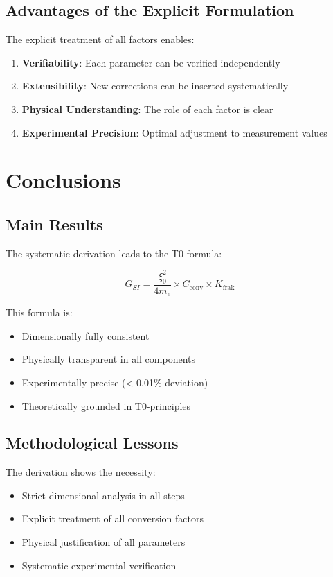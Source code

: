 \documentclass[12pt,a4paper]{article}
\newcommand{\Kfrak}{K_{\text{frak}}}
\newcommand{\Cconv}{C_{\text{conv}}}
\begin{document}
	\subsection{Advantages of the Explicit Formulation}
	
	The explicit treatment of all factors enables:
	
	\begin{enumerate}
		\item \textbf{Verifiability}: Each parameter can be verified independently
		\item \textbf{Extensibility}: New corrections can be inserted systematically
		\item \textbf{Physical Understanding}: The role of each factor is clear
		\item \textbf{Experimental Precision}: Optimal adjustment to measurement values
	\end{enumerate}
	
	\section{Conclusions}
	
	\subsection{Main Results}
	
	The systematic derivation leads to the T0-formula:
	
	\begin{equation}
		\boxed{G_{SI} = \frac{\xi_0^2}{4 m_e} \times \Cconv \times \Kfrak}
	\end{equation}
	
	This formula is:
	\begin{itemize}
		\item Dimensionally fully consistent
		\item Physically transparent in all components
		\item Experimentally precise (< 0.01\% deviation)
		\item Theoretically grounded in T0-principles
	\end{itemize}
	
	\subsection{Methodological Lessons}
	
	The derivation shows the necessity:
	\begin{itemize}
		\item Strict dimensional analysis in all steps
		\item Explicit treatment of all conversion factors
		\item Physical justification of all parameters
		\item Systematic experimental verification
	\end{itemize}
	
\end{document}

